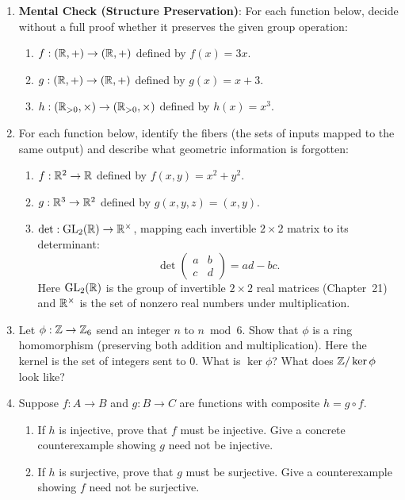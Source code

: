 \begin{enumerate}
  \item \textbf{Mental Check (Structure Preservation)}: For each function below, decide without a full proof whether it preserves the given group operation:
  \begin{enumerate}
    \item $f: (\mathbb{R}, +) \to (\mathbb{R}, +)$ defined by $f(x) = 3x$.
    \item $g: (\mathbb{R}, +) \to (\mathbb{R}, +)$ defined by $g(x) = x + 3$.
    \item $h: (\mathbb{R}_{>0}, \times) \to (\mathbb{R}_{>0}, \times)$ defined by $h(x) = x^3$.
  \end{enumerate}
  \item For each function below, identify the fibers (the sets of inputs mapped to the same output) and describe what geometric information is forgotten:
  \begin{enumerate}
    \item $f: \mathbb{R}^2 \to \mathbb{R}$ defined by $f(x, y) = x^2 + y^2$.
    \item $g: \mathbb{R}^3 \to \mathbb{R}^2$ defined by $g(x, y, z) = (x, y)$.
    \item $\det: \operatorname{GL}_2(\mathbb{R}) \to \mathbb{R}^\times$, mapping each invertible $2 \times 2$ matrix to its determinant:
    \[
    \det \begin{pmatrix} a & b \\ c & d \end{pmatrix} = ad - bc.
    \]
    Here $\operatorname{GL}_2(\mathbb{R})$ is the group of invertible $2 \times 2$ real matrices (Chapter~21) and $\mathbb{R}^\times$ is the set of nonzero real numbers under multiplication.
  \end{enumerate}
  \item Let $\phi: \mathbb{Z} \to \mathbb{Z}_6$ send an integer $n$ to $n \bmod 6$. Show that $\phi$ is a ring homomorphism (preserving both addition and multiplication). Here the kernel is the set of integers sent to $0$. What is $\ker\phi$? What does $\mathbb{Z}/\ker\phi$ look like?
  \item Suppose $f: A \to B$ and $g: B \to C$ are functions with composite $h = g \circ f$.
  \begin{enumerate}
    \item If $h$ is injective, prove that $f$ must be injective. Give a concrete counterexample showing $g$ need not be injective.
    \item If $h$ is surjective, prove that $g$ must be surjective. Give a counterexample showing $f$ need not be surjective.
  \end{enumerate}

\end{enumerate}
